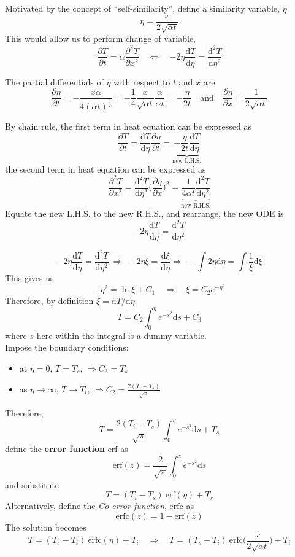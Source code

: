 \documentclass[12pt, a4paper]{article}
\begin{document}
Motivated by the concept of ``self-similarity'', define a similarity variable, $\eta$
\[
    \eta = \frac{x}{2\sqrt{\alpha t}}
\]
This would allow us to perform change of variable,
\[
    \frac{\partial T}{\partial t} = \alpha \frac{\partial^2 T}{\partial x^2} \quad \Leftrightarrow \quad \boxed{-2\eta \frac{\mathrm{d}T}{\mathrm{d}\eta} = \frac{\mathrm{d}^{2}T}{\mathrm{d}\eta^{2}}}
\]
\begin{tcolorbox}[title = Derivation]
The partial differentials of $\eta$ with respect to $t$ and $x$ are
\[
    \frac{\partial \eta}{\partial t} 
    = -\frac{x\alpha}{4(\alpha t)^{\frac{3}{2}}} 
    = -\frac{1}{4} \frac{x}{\sqrt{\alpha t}}\frac{\alpha}{\alpha t}
    = -\frac{\eta}{2t}
    \quad \text{and} \quad
    \frac{\partial \eta}{\partial x} = \frac{1}{2\sqrt{\alpha t}}
\]

By chain rule, the first term in heat equation can be expressed as
    \[
        \frac{\partial T}{\partial t} = \frac{\mathrm{d}T}{\mathrm{d}\eta} \frac{\partial \eta}{\partial t} = \underbrace{-\frac{\eta}{2t} \frac{\mathrm{d}T}{\mathrm{d}\eta}}_{\text{new L.H.S.}}
    \]
the second term in heat equation can be expressed as
\[
    \frac{\partial^2 T}{\partial x^2} = \frac{\mathrm{d}^2 T}{\mathrm{d} \eta^2} \bigg( \frac{\partial \eta}{\partial x} \bigg)^2 = \underbrace{\frac{1}{4 \alpha t} \frac{\mathrm{d}^2 T}{\mathrm{d} \eta^2}}_{\text{new R.H.S.}}
\]
Equate the new L.H.S. to the new R.H.S., and rearrange, the new ODE is
\[
    -2\eta \frac{\mathrm{d}T}{\mathrm{d}\eta} = \frac{\mathrm{d}^{2}T}{\mathrm{d}\eta^{2}}
\]
\end{tcolorbox}

\[
    -2\eta \frac{\mathrm{d}T}{\mathrm{d}\eta} = \frac{\mathrm{d}^{2}T}{\mathrm{d}\eta^{2}} \ \Rightarrow \ -2 \eta \xi = \frac{\mathrm{d}\xi}{\mathrm{d}\eta} \Rightarrow \ -\int 2\eta \mathrm{d}\eta = \int \frac{1}{\xi} \mathrm{d}\xi
\]
This gives us
\[
    -\eta^2 = \ln\xi + C_1 \quad \Rightarrow \quad \xi = C_2 e^{-\eta^2}
\]
Therefore, by definition $\xi = \mathrm{d}T/\mathrm{d}\eta$:
\[
    T = C_2 \int_{0}^{\eta} e^{-s^2} \mathrm{d}s + C_3
\]
where $s$ here within the integral is a dummy variable.\\

Impose the boundary conditions:
\begin{itemize}
    \item at $\eta = 0$, $T = T_s$, $\Rightarrow C_3 = T_s$
    \item as $\eta \to \infty$, $T \to T_i$, $\Rightarrow C_2 = \frac{2(T_i - T_s)}{\sqrt{\pi}}$
\end{itemize}
Therefore, 
\[
    T =  \frac{2(T_i - T_s)}{\sqrt{\pi}} \int_{0}^{\eta} e^{-s^2} \mathrm{d}s + T_s
\]
define the \textbf{error function} $\mathrm{erf}$ as
\[
    \mathrm{erf}(z) = \frac{2}{\sqrt{\pi}} \int_{0}^{z} e^{-s^2} \mathrm{d}s
\]
and substitute
\[
    T = (T_i - T_s) \ \mathrm{erf}(\eta) + T_s
\]
Alternatively, define the \textit{Co-error function}, $\mathrm{erfc}$ as 
\[
    \mathrm{erfc}(z) = 1 - \mathrm{erf}(z)
\]
The solution becomes 
\[
    T = (T_s - T_i) \ \mathrm{erfc}(\eta) + T_i \quad \Rightarrow \quad \boxed{T = (T_s - T_i) \ \mathrm{erfc}\bigg(\frac{x}{2\sqrt{\alpha t}}\bigg) + T_i}
\]
\end{document}
